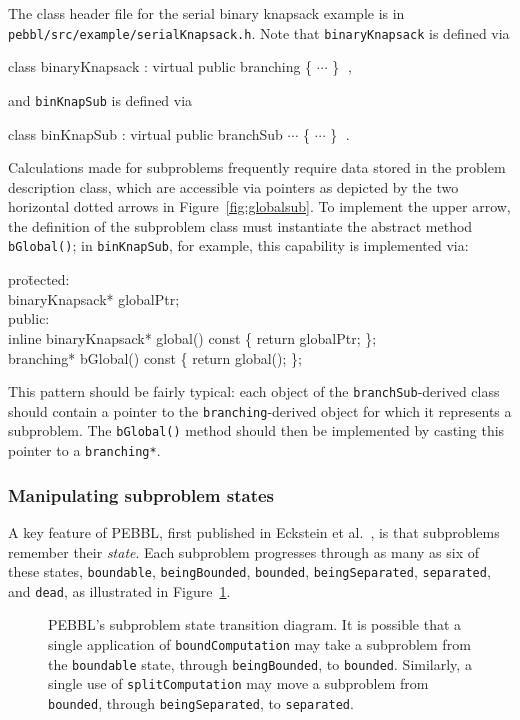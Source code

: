 The class header file for the serial binary knapsack example is in
\texttt{pebbl/\linebreak[0]src/\linebreak[0]example/\linebreak[0]serialKnapsack.h}.  
Note that
\texttt{binaryKnapsack} is defined via
\begin{codeblock}
class binaryKnapsack : virtual public branching \{ $\cdots$ \}
$\;,$
\end{codeblock}
and \texttt{binKnapSub} is defined via
\begin{codeblock}
class binKnapSub : virtual public branchSub $\cdots$ \{ $\cdots$ \}
$\;.$
\end{codeblock}
Calculations made for subproblems frequently require data
stored in the problem description class, which are accessible via
pointers as depicted by the two horizontal dotted arrows in
Figure~\ref{fig:globalsub}.  To implement the upper arrow, the
definition of the subproblem class must instantiate the abstract
method \texttt{bGlobal()}; in \texttt{binKnapSub}, for example, this
capability is implemented via:
\begin{codeblock}
pro\=tected: \\
\>  binaryKnapsack* globalPtr;\\
public:\\
\>  inline binaryKnapsack* global() const \{ return globalPtr; \};\\
\>  branching* bGlobal() const \{ return global(); \};\\
\end{codeblock}
This pattern should be fairly typical: each object of the
\texttt{branchSub}-derived class should contain a pointer to the
\texttt{branching}-derived object for which it represents a
subproblem.  The \texttt{bGlobal()} method should then be implemented
by casting this pointer to a \texttt{branching*}.


\subsubsection{Manipulating subproblem states}
A key feature of PEBBL, first published in Eckstein et al.~\cite{EPH00}, is that
subproblems remember their \emph{state}.  Each subproblem progresses
through as many as six of these states, \texttt{boundable},
\texttt{beingBounded}, \texttt{bounded}, \texttt{beingSeparated}, 
\texttt{separated}, and \texttt{dead}, as illustrated in
Figure~\ref{fig:states}.

\begin{figure}[tbp]
\begin{center}
\vspace{-0.2in}
\end{center}
\caption{PEBBL's subproblem state transition diagram.  It is possible
that a single application of \texttt{boundComputation} may take a
subproblem from the \texttt{boundable} state, through
\texttt{beingBounded}, to \texttt{bounded}.  Similarly, a single use
of \texttt{splitComputation} may move a subproblem from
\texttt{bounded}, through \texttt{beingSeparated}, to
\texttt{separated}.}
\label{fig:states}
\end{figure}


